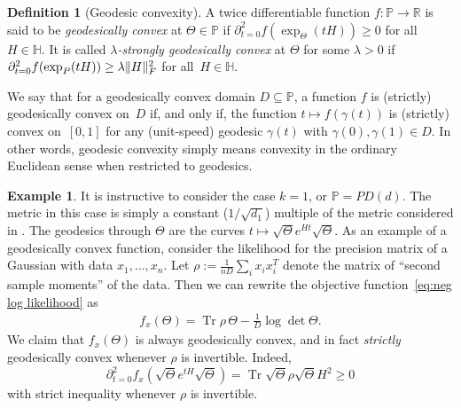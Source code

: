 \documentclass[aos]{imsart}
\theoremstyle{definition}
\newtheorem{definition}[theorem]{Definition}
\newtheorem{example}[theorem]{Example}
\numberwithin{equation}{section}
\DeclareMathOperator{\tr}{Tr}
\DeclarePairedDelimiter{\norm}{\lVert}{\rVert}
\newcommand{\R}{{\mathbb{R}}}
\renewcommand{\P}{{\mathbb{P}}}
\renewcommand{\H}{{\mathbb{H}}}
\begin{document}
\begin{definition}[Geodesic convexity]
A twice differentiable function $f\colon \P \to \R$ is said to be \emph{geodesically convex} at $\Theta\in\P$ if $\partial^2_{t=0} f(\exp_\Theta(tH)) \geq 0$ for all~$H\in\H$.
It is called \emph{$\lambda$-strongly geodesically convex} at $\Theta$ for some $\lambda>0$ if $\partial^2_{t=0} f(\exp_P(tH)) \geq \lambda \norm H_F^2$ for all~$H\in\H$.


We say that for a geodesically convex domain $D \subseteq \P$, a function $f$ is (strictly) geodesically convex on~$D$ if, and only if, the function $t \mapsto f(\gamma(t))$ is (strictly) convex on~$[0,1]$ for any (unit-speed) geodesic $\gamma(t)$ with $\gamma(0),\gamma(1)\in D$.
In other words, geodesic convexity simply means convexity in the ordinary Euclidean sense when restricted to geodesics.

\begin{example}\label{exa:usual-likelihood} It is instructive to consider the case $k = 1$, or $\P = PD(d)$. The metric in this case is simply a constant ($1/\sqrt{d_1}$) multiple of the metric considered in \citep{bhatia2009positive,skovgaard1984riemannian}. The geodesics through $\Theta$ are the curves $t \mapsto \sqrt{\Theta} e^{H t} \sqrt{\Theta}.$ As an example of a geodesically convex function, consider the likelihood for the precision matrix of a Gaussian with data $x_1, \dots, x_n$. Let $\rho := \frac1{nD}\sum_i x_i x_i^T$ denote the matrix of ``second sample moments'' of the data. Then we can rewrite the objective function~\eqref{eq:neg log likelihood} as
\begin{align*}%
  f_x(\Theta) = \tr \rho \, \Theta - \frac1D \log \det \Theta.
\end{align*}
We claim that $f_x(\Theta)$ is always geodesically convex, and in fact \emph{strictly} geodesically convex whenever $\rho$ is invertible. Indeed, 
$$ \partial^2_{t = 0} f_x(\sqrt{\Theta} e^{t H} \sqrt{\Theta}) = \tr \sqrt{\Theta} \rho \sqrt{\Theta} H^2 \geq 0 $$ 
with strict inequality whenever $\rho$ is invertible.

\end{example}


\end{definition}
\end{document}
